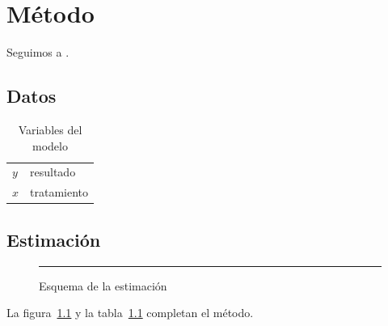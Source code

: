 \chapter{Método}
\label{cap:metodo}
Seguimos a \parencite{lamport1994}.

\section{Datos}
\begin{table}[h]
  \centering
  \caption{Variables del modelo}
  \label{tab:variables}
  \begin{tabular}{ll}
    $y$ & resultado \\
    $x$ & tratamiento \\
  \end{tabular}
\end{table}

\section{Estimación}
\begin{figure}[h]
  \centering
  \rule{4cm}{2cm}
  \caption{Esquema de la estimación}
  \label{fig:esquema}
\end{figure}
La figura~\ref{fig:esquema} y la tabla~\ref{tab:variables} completan el método.
